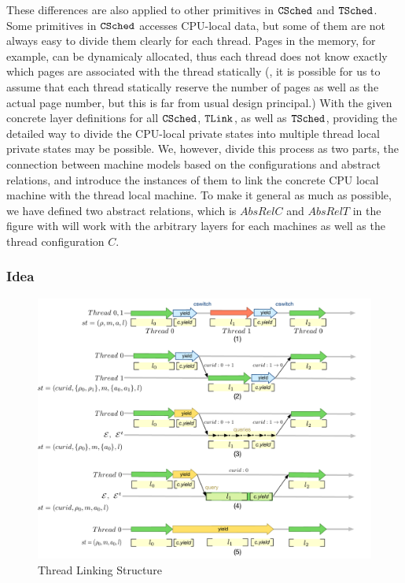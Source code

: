 These differences are also applied to 
other primitives in ${{\mathrm{\texttt{CSched}}}}$ and ${{\mathrm{\texttt{TSched}}}}$.
Some primitives in ${{\mathrm{\texttt{CSched}}}}$ accesses CPU-local data, but some of them 
are not always easy to divide them clearly for each thread. 
Pages in the memory, for example, 
can be dynamicaly allocated, thus 
each thread does not know exactly 
which pages are associated with the thread statically
(\ie, it is possible for us to assume that each thread statically 
reserve the number of pages as well as 
the actual page number, but this is far from usual design principal.)
With the given concrete layer definitions for 
all ${{\mathrm{\texttt{CSched}}}}$, ${{\mathrm{\texttt{TLink}}}}$, as well as ${{\mathrm{\texttt{TSched}}}}$,
providing the detailed 
way to divide the CPU-local private states into multiple thread local private states 
may be possible. 
We, however, divide this process 
as two parts, the connection between machine models based on the configurations and abstract relations, 
and introduce the instances of them to link the concrete CPU local machine with 
the thread local machine. 
To make it general as much as possible, 
we have defined two abstract relations, 
which is $AbsRelC$ and $AbsRelT$ in the figure with will work 
with the arbitrary layers for each machines as well as the thread configuration $C$. 



\subsubsection{Idea} 

\begin{figure}
\begin{center}
\includegraphics[width=\textwidth]{figs/conlink/thread-linking}
\end{center}
\caption{Thread Linking Structure}
\label{fig:chapter:conlink:threadlinking}
\end{figure}

